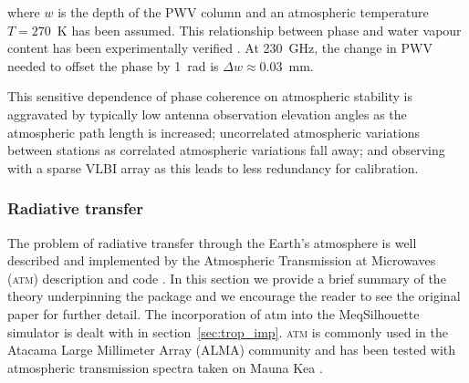 \noindent where $w$ is the depth of the PWV column \citep*{Carilli_1999} and an atmospheric temperature $T=270$~K has been assumed. This relationship between phase and water vapour content has been experimentally verified \citep{hogg_1981}. At 230~GHz, the change in PWV needed to offset the phase by 1~rad is $\Delta w\approx0.03$~mm. 

This sensitive dependence of phase coherence on atmospheric stability is aggravated by typically low antenna observation elevation angles as the atmospheric path length is increased; uncorrelated atmospheric variations between stations as correlated atmospheric variations fall away; and observing with a sparse VLBI array as this leads to less redundancy for calibration.


\subsubsection{Radiative transfer}\label{sec:atm_theory}

The problem of radiative transfer through the Earth's atmosphere is well described and implemented by the Atmospheric Transmission at Microwaves (\textsc{atm}) description and code \citep{Pardo_2001}. In this section we provide a brief summary of the theory underpinning the package and we encourage the reader to see the original paper for further detail. The incorporation of {\sc atm} into the {\sc MeqSilhouette} simulator is dealt with in section~\ref{sec:trop_imp}. \textsc{atm} is commonly used in the Atacama Large Millimeter Array (ALMA) community \citep{Curtis_2009,Nikolic_2013} and has been tested with atmospheric transmission spectra taken on Mauna Kea \citep{Serabyn_1998}.

